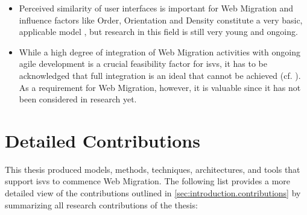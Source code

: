 \begin{itemize}
\item
  Perceived similarity of user interfaces is important for \gls{Web Migration} and influence factors like Order, Orientation and Density constitute a very basic, applicable model \autocite{Bakaev2019JWE,Heil2016Similarity}, but research in this field is still very young and ongoing.
\item
  While a high degree of integration of \gls{Web Migration} activities with ongoing agile development is a crucial feasibility factor for \glspl{isv}, it has to be acknowledged that full integration is an ideal that cannot be achieved (cf. ).
As a requirement for \gls{Web Migration}, however, it is valuable since it has not been considered in research yet.
\end{itemize}

\hypertarget{sec:conclusion.contributions}{%
\section{Detailed Contributions}\label{sec:conclusion.contributions}}
\vspace{15pt}

This thesis produced models, methods, techniques, architectures, and tools that support \glspl{isv} to commence \gls{Web Migration}.
The following list provides a more detailed view of the contributions outlined in \cref{sec:introduction.contributions} by summarizing all research contributions of the thesis:

